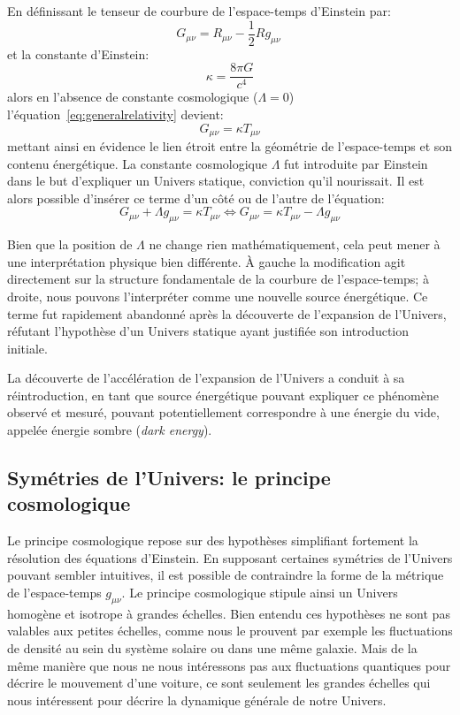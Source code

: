 \documentclass[../main/main.tex]{subfiles}
\begin{document}
En définissant le tenseur de courbure de l'espace-temps d'Einstein par:
\begin{equation}
  \label{eq:tenseurspacetime}
  G_{\mu\nu} = R_{\mu\nu} - \frac{1}{2}Rg_{\mu\nu} \ 
\end{equation}
et la constante d'Einstein:
\begin{equation}
  \label{eq:einsteinconstante}
  \kappa = \frac{8\pi G}{c^{4}}
\end{equation}
alors en l'absence de constante cosmologique ($\Lambda=0$)
l'équation~\ref{eq:generalrelativity} devient:
\begin{equation}
  \label{eq:einsteinreduce}
  G_{\mu\nu} = \kappa T_{\mu\nu}
\end{equation}
mettant ainsi en évidence le lien étroit entre la géométrie de
l'espace-temps et son contenu énergétique.
La constante cosmologique $\Lambda$ fut introduite par Einstein dans le
but d'expliquer un Univers statique, conviction qu'il nourissait. Il est
alors possible d'insérer ce terme d'un côté ou de l'autre de l'équation:
\begin{equation}
  \label{eq:einsteinlambda}
  G_{\mu\nu} + \Lambda g_{\mu\nu} = \kappa T_{\mu\nu} \Longleftrightarrow G_{\mu\nu}  = \kappa T_{\mu\nu} - \Lambda g_{\mu\nu}
\end{equation}

Bien que la position de $\Lambda$ ne change rien mathématiquement, cela peut mener à une
interprétation physique bien différente. À gauche la modification agit
directement sur la structure fondamentale de la courbure de l'espace-temps;
à droite, nous pouvons l'interpréter comme une nouvelle source
énergétique. Ce terme fut rapidement abandonné après la découverte de
l'expansion de l'Univers, réfutant l'hypothèse d'un Univers statique
ayant justifiée son introduction initiale.

La découverte de l'accélération de l'expansion de l'Univers
\citep{Riess1998, Perlmutter1999} a conduit à sa réintroduction, en tant
que source énergétique pouvant expliquer ce phénomène observé et mesuré,
pouvant potentiellement correspondre à une énergie du vide, appelée
énergie sombre (\textit{dark energy}).

\subsection{Symétries de l'Univers: le principe cosmologique}

Le principe cosmologique repose sur des hypothèses simplifiant fortement
la résolution des équations d'Einstein. En supposant certaines symétries
de l'Univers pouvant sembler intuitives, il est possible de contraindre la forme de
la métrique de l'espace-temps $g_{\mu\nu}$. Le principe cosmologique
stipule ainsi un Univers homogène et isotrope à grandes échelles.
Bien entendu ces hypothèses ne sont pas valables aux petites échelles,
comme nous le prouvent par exemple les fluctuations de densité au sein
du système solaire ou dans une même galaxie. Mais de la même manière que
nous ne nous intéressons pas aux fluctuations quantiques pour décrire le
mouvement d'une voiture, ce sont seulement les grandes échelles qui nous
intéressent pour décrire la dynamique générale de notre Univers.
\end{document}
